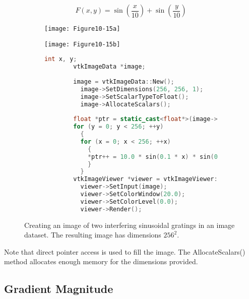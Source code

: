 \begin{equation}\label{eq:10.3}
F(x, y) = \sin\left(\frac{x}{10}\right) + \sin\left(\dfrac{y}{10}\right)
\end{equation}

\begin{figure}[htb]
    \centering
	\begin{subfigure}[h]{0.48\linewidth}
		\texttt{[image: Figure10-15a]}
		\captionsetup{justification=centering}
		\caption*{}
		\label{fig:Figure10-15a}
	\end{subfigure}
	\hfill
	\begin{subfigure}[h]{0.48\linewidth}
		\texttt{[image: Figure10-15b]}
		\captionsetup{justification=centering}
		\caption*{}
        \label{fig:Figure10-15b}
	\end{subfigure}
	\hfill
	\begin{subfigure}[h]{0.96\linewidth}
       \begin{lstlisting}[language=C++,  caption={}, numbers=none, frame=none]
        int x, y;
        vtkImageData *image;
        
        image = vtkImageData::New();
          image->SetDimensions(256, 256, 1);
          image->SetScalarTypeToFloat();
          image->AllocateScalars();
        
        float *ptr = static_cast<float*>(image->GetScalarPointer());
        for (y = 0; y < 256; ++y)
          {
          for (x = 0; x < 256; ++x)
            {
            *ptr++ = 10.0 * sin(0.1 * x) * sin(0.1 * y);
            }
          }
        vtkImageViewer *viewer = vtkImageViewer::New();
          viewer->SetInput(image);
          viewer->SetColorWindow(20.0);
          viewer->SetColorLevel(0.0);
          viewer->Render();
        \end{lstlisting}
        \label{fig:Figure10-15d}
	\end{subfigure}
	\caption{Creating an image of two interfering sinusoidal gratings in an image dataset. The resulting image has dimensions $256^2$.}\label{fig:Figure10-15}
\end{figure}

Note that direct pointer access is used to fill the image. The AllocateScalars() method allocates enough memory for the dimensions provided.

\subsection{Gradient Magnitude}

